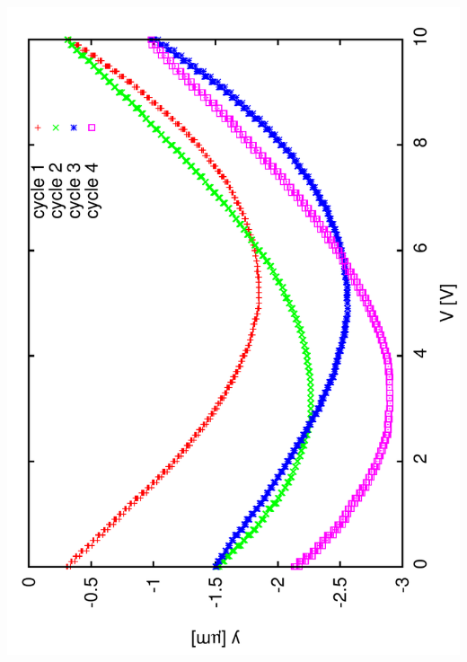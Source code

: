 \documentclass[a4paper,11pt]{book}
\begin{document}
\includegraphics[angle=-90,scale=0.15]{image52.pdf}
\end{document}
